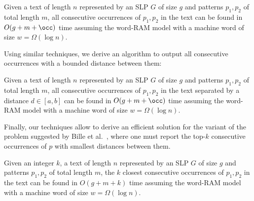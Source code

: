 \begin{theorem}\label{th:main}
Given a text of length $n$ represented by an SLP $G$ of size $g$ and patterns $p_1,p_2$ of total length $m$, all consecutive occurrences of $p_1,p_2$ in the text can be found in $O(g+m+\occ)$ time assuming the word-RAM model with a machine word of size $w = \Omega(\log n)$. 
\end{theorem}

Using similar techniques, we derive an algorithm to output all consecutive occurrences with a bounded distance between them:

\begin{corollary}\label{cor:ab}
Given a text of length $n$ represented by an SLP $G$ of size $g$ and patterns $p_1,p_2$ of total length $m$, all consecutive occurrences of $p_1,p_2$ in the text separated by a distance $d \in [a,b]$ can be found in $O(g+m+\occ)$ time assuming the word-RAM model with a machine word of size $w = \Omega(\log n)$. 
\end{corollary}

Finally, our techniques allow to derive an efficient solution for 
the variant of the problem suggested by Bille et al.~\cite{DBLP:conf/fsttcs/BilleGPRS20}, where one must report the top-$k$ consecutive occurrences of $p$ with smallest distances between them. 

\begin{corollary}\label{cor:topk}
Given an integer $k$, a text of length $n$ represented by an SLP $G$ of size $g$ and patterns $p_1,p_2$ of total length $m$, the $k$ closest consecutive occurrences of $p_1,p_2$ in the text can be found in $O(g+m+k)$ time assuming the word-RAM model with a machine word of size $w = \Omega(\log n)$. 
\end{corollary}